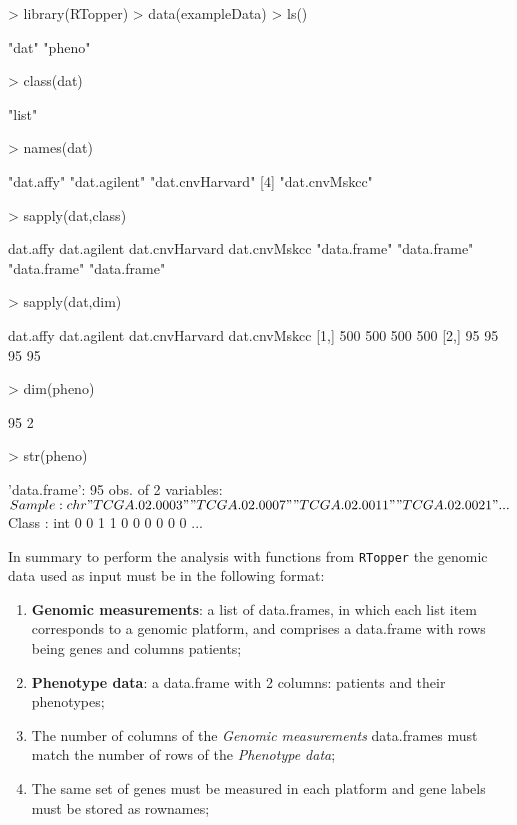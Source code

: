 \documentclass[11pt]{article}
\newcommand{\Rpackage}[1]{{\texttt{#1}}}
\begin{document}
\begin{Schunk}
\begin{Sinput}
> library(RTopper)
> data(exampleData)
> ls()
\end{Sinput}
\begin{Soutput}
[1] "dat"   "pheno"
\end{Soutput}
\begin{Sinput}
> class(dat)
\end{Sinput}
\begin{Soutput}
[1] "list"
\end{Soutput}
\begin{Sinput}
> names(dat)
\end{Sinput}
\begin{Soutput}
[1] "dat.affy"       "dat.agilent"    "dat.cnvHarvard"
[4] "dat.cnvMskcc"  
\end{Soutput}
\begin{Sinput}
> sapply(dat,class)
\end{Sinput}
\begin{Soutput}
      dat.affy    dat.agilent dat.cnvHarvard   dat.cnvMskcc 
  "data.frame"   "data.frame"   "data.frame"   "data.frame" 
\end{Soutput}
\begin{Sinput}
> sapply(dat,dim)
\end{Sinput}
\begin{Soutput}
     dat.affy dat.agilent dat.cnvHarvard dat.cnvMskcc
[1,]      500         500            500          500
[2,]       95          95             95           95
\end{Soutput}
\begin{Sinput}
> dim(pheno)
\end{Sinput}
\begin{Soutput}
[1] 95  2
\end{Soutput}
\begin{Sinput}
> str(pheno)
\end{Sinput}
\begin{Soutput}
'data.frame':	95 obs. of  2 variables:
 $ Sample: chr  "TCGA.02.0003" "TCGA.02.0007" "TCGA.02.0011" "TCGA.02.0021" ...
 $ Class : int  0 0 1 1 0 0 0 0 0 0 ...
\end{Soutput}
\end{Schunk}

In summary to perform the analysis with functions from \Rpackage{RTopper}
the genomic data used as input must be in the following format:
\begin{enumerate}
 \item {\bf Genomic measurements}: a list of data.frames, in which each list item corresponds 
  to a genomic platform, and comprises a data.frame with rows being genes and columns patients;
 \item {\bf Phenotype data}: a data.frame with 2 columns: patients and their phenotypes;
 \item The number of columns of the {\it Genomic measurements} data.frames must match the number
   of rows of the {\it Phenotype data};
 \item The same set of genes must be measured in each platform and gene labels must be stored as rownames;
\end{enumerate}
\end{document}
